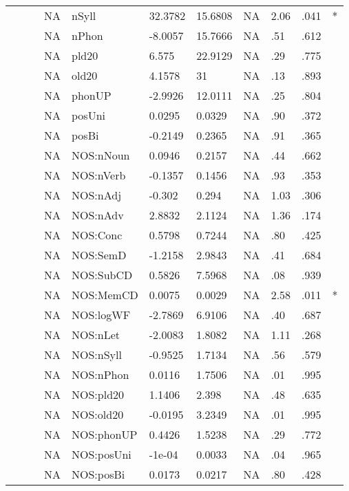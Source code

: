 \begin{table}[ht]
\begin{tabular}{lllllllllll}
   &  &  & NA & nSyll & 32.3782 & 15.6808 & NA & 2.06 & .041 & * \\ 
   &  &  & NA & nPhon & -8.0057 & 15.7666 & NA & .51 & .612 &   \\ 
   &  &  & NA & pld20 & 6.575 & 22.9129 & NA & .29 & .775 &   \\ 
   &  &  & NA & old20 & 4.1578 & 31 & NA & .13 & .893 &   \\ 
   &  &  & NA & phonUP & -2.9926 & 12.0111 & NA & .25 & .804 &   \\ 
   &  &  & NA & posUni & 0.0295 & 0.0329 & NA & .90 & .372 &   \\ 
   &  &  & NA & posBi & -0.2149 & 0.2365 & NA & .91 & .365 &   \\ 
   &  &  & NA & NOS:nNoun & 0.0946 & 0.2157 & NA & .44 & .662 &   \\ 
   &  &  & NA & NOS:nVerb & -0.1357 & 0.1456 & NA & .93 & .353 &   \\ 
   &  &  & NA & NOS:nAdj & -0.302 & 0.294 & NA & 1.03 & .306 &   \\ 
   &  &  & NA & NOS:nAdv & 2.8832 & 2.1124 & NA & 1.36 & .174 &   \\ 
   &  &  & NA & NOS:Conc & 0.5798 & 0.7244 & NA & .80 & .425 &   \\ 
   &  &  & NA & NOS:SemD & -1.2158 & 2.9843 & NA & .41 & .684 &   \\ 
   &  &  & NA & NOS:SubCD & 0.5826 & 7.5968 & NA & .08 & .939 &   \\ 
   &  &  & NA & NOS:MemCD & 0.0075 & 0.0029 & NA & 2.58 & .011 & * \\ 
   &  &  & NA & NOS:logWF & -2.7869 & 6.9106 & NA & .40 & .687 &   \\ 
   &  &  & NA & NOS:nLet & -2.0083 & 1.8082 & NA & 1.11 & .268 &   \\ 
   &  &  & NA & NOS:nSyll & -0.9525 & 1.7134 & NA & .56 & .579 &   \\ 
   &  &  & NA & NOS:nPhon & 0.0116 & 1.7506 & NA & .01 & .995 &   \\ 
   &  &  & NA & NOS:pld20 & 1.1406 & 2.398 & NA & .48 & .635 &   \\ 
   &  &  & NA & NOS:old20 & -0.0195 & 3.2349 & NA & .01 & .995 &   \\ 
   &  &  & NA & NOS:phonUP & 0.4426 & 1.5238 & NA & .29 & .772 &   \\ 
   &  &  & NA & NOS:posUni & -1e-04 & 0.0033 & NA & .04 & .965 &   \\ 
   &  &  & NA & NOS:posBi & 0.0173 & 0.0217 & NA & .80 & .428 &   \\ 

\end{tabular}
\end{table}
